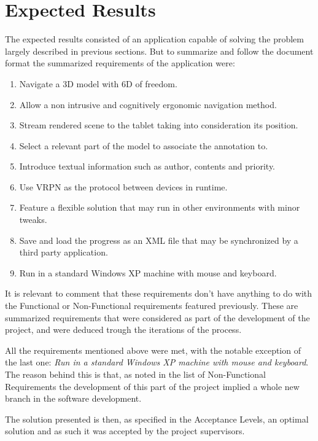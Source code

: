 \section{Expected Results}
The expected results consisted of an application capable of solving the problem largely described in previous sections. But to summarize and follow the document format the summarized requirements of the application were:

\begin{enumerate}
	\item Navigate a 3D model with 6D of freedom.
	\item Allow a non intrusive and cognitively ergonomic navigation method.
	\item Stream rendered scene to the tablet taking into consideration its position.
	\item Select a relevant part of the model to associate the annotation to.
	\item Introduce textual information such as author, contents and priority.
	\item Use VRPN as the protocol between devices in runtime.
	\item Feature a flexible solution that may run in other environments with minor tweaks.
	\item Save and load the progress as an XML file that may be synchronized by a third party application.
	\item Run in a standard Windows XP machine with mouse and keyboard.
\end{enumerate}

It is relevant to comment that these requirements don't have anything to do with the Functional or Non-Functional requirements featured previously. These are summarized requirements that were considered as part of the development of the project, and were deduced trough the iterations of the process.

All the requirements mentioned above were met, with the notable exception of the last one: \emph{Run in a standard Windows XP machine with mouse and keyboard}. The reason behind this is that, as noted in the list of Non-Functional Requirements the development of this part of the project  implied a whole new branch in the software development.

The solution presented is then, as specified in the Acceptance Levels, an optimal solution and as such it was accepted by the project supervisors. 